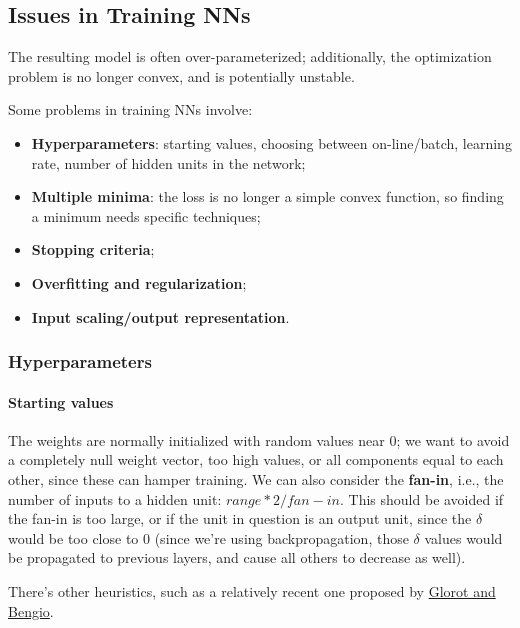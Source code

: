 \subsection{Issues in Training NNs}

The resulting model is often over-parameterized; additionally, the optimization problem is no longer convex, and is potentially unstable.

Some problems in training NNs involve:
\begin{itemize}
    \item \textbf{Hyperparameters}: starting values, choosing between on-line/batch, learning rate, number of hidden units in the network;

    \item \textbf{Multiple minima}: the loss is no longer a simple convex function, so finding a minimum needs specific techniques;

    \item \textbf{Stopping criteria};

    \item \textbf{Overfitting and regularization};

    \item \textbf{Input scaling/output representation}.
\end{itemize}

\subsubsection{Hyperparameters}

\paragraph{Starting values}

The weights are normally initialized with random values near 0; we want to avoid a completely null weight vector, too high values, or all components equal to each other, since these can hamper training. We can also consider the \textbf{fan-in}, i.e., the number of inputs to a hidden unit: $range * 2 /fan-in$. This should be avoided if the fan-in is too large, or if the unit in question is an output unit, since the $\delta$ would be too close to 0 (since we're using backpropagation, those $\delta$ values would be propagated to previous layers, and cause all others to decrease as well).

There's other heuristics, such as a relatively recent one proposed by \href{https://proceedings.mlr.press/v9/glorot10a/glorot10a.pdf}{Glorot and Bengio}.

